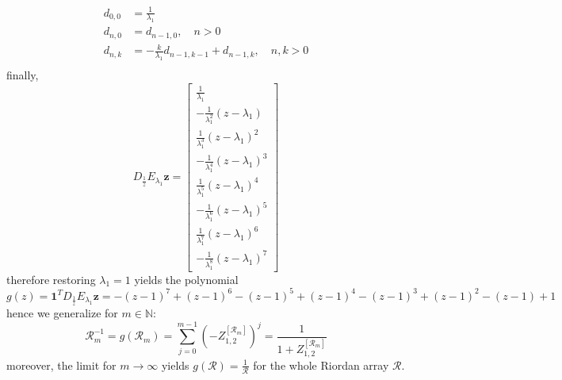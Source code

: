 \begin{displaymath}
\begin{split}
d_{0,0}&=\frac{1}{\lambda_{1}}\\
d_{n,0}&=d_{n-1, 0}, \quad n>0 \\
d_{n,k}&=-\frac{k}{\lambda_{1}}d_{n-1, k-1} + d_{n-1,k}, \quad n,k > 0\\
\end{split}
\end{displaymath}
finally,
\begin{displaymath}
D_{\frac{1}{z}}E_{\lambda_{1}}\boldsymbol{z} = \left[\begin{matrix}\frac{1}{\lambda_{1}}\\- \frac{1}{\lambda_{1}^{2}} \left(z - \lambda_{1}\right)\\\frac{1}{\lambda_{1}^{3}} \left(z - \lambda_{1}\right)^{2}\\- \frac{1}{\lambda_{1}^{4}} \left(z - \lambda_{1}\right)^{3}\\\frac{1}{\lambda_{1}^{5}} \left(z - \lambda_{1}\right)^{4}\\- \frac{1}{\lambda_{1}^{6}} \left(z - \lambda_{1}\right)^{5}\\\frac{1}{\lambda_{1}^{7}} \left(z - \lambda_{1}\right)^{6}\\- \frac{1}{\lambda_{1}^{8}} \left(z - \lambda_{1}\right)^{7}\end{matrix}\right]
\end{displaymath}
therefore restoring $\lambda_{1}=1$ yields the polynomial
\[g{\left (z \right )} = \boldsymbol{1}^{T}D_{\frac{1}{z}}E_{\lambda_{1}}\boldsymbol{z} = - \left(z - 1\right)^{7} + \left(z - 1\right)^{6} - \left(z - 1\right)^{5} + \left(z - 1\right)^{4} - \left(z - 1\right)^{3} + \left(z - 1\right)^{2} - (z-1) + 1\]
hence we generalize for $m\in\mathbb{N}$:
\begin{displaymath}
\mathcal{R}_{m}^{-1} = g{\left (\mathcal{R}_{m} \right )} = \sum_{j=0}^{m-1}{\left(-Z_{1,2}^{[\mathcal{R}_{m}]}\right)^{j}} = \frac{1}{1+Z_{1,2}^{[\mathcal{R}_{m}]}}
\end{displaymath}
moreover, the limit for $m \rightarrow \infty$ yields $ g{\left (\mathcal{R} \right )} = \frac{1}{\mathcal{R}} $ for the whole Riordan array $\mathcal{R}$.

